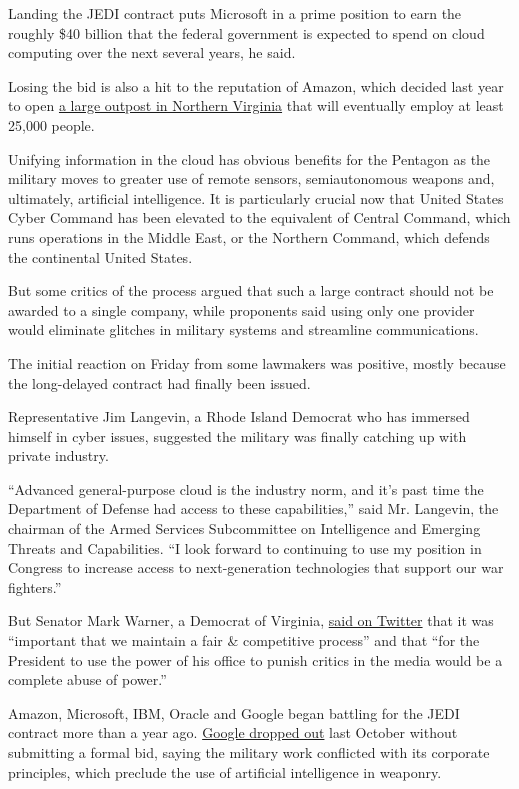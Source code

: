 Landing the JEDI contract puts Microsoft in a prime position to earn the
roughly \$40 billion that the federal government is expected to spend on
cloud computing over the next several years, he said.

Losing the bid is also a hit to the reputation of Amazon, which decided
last year to open
\href{https://www.nytimes3xbfgragh.onion/2018/11/13/business/national-landing-amazon-va.html}{a
large outpost in Northern Virginia} that will eventually employ at least
25,000 people.

Unifying information in the cloud has obvious benefits for the Pentagon
as the military moves to greater use of remote sensors, semiautonomous
weapons and, ultimately, artificial intelligence. It is particularly
crucial now that United States Cyber Command has been elevated to the
equivalent of Central Command, which runs operations in the Middle East,
or the Northern Command, which defends the continental United States.

But some critics of the process argued that such a large contract should
not be awarded to a single company, while proponents said using only one
provider would eliminate glitches in military systems and streamline
communications.

The initial reaction on Friday from some lawmakers was positive, mostly
because the long-delayed contract had finally been issued.

Representative Jim Langevin, a Rhode Island Democrat who has immersed
himself in cyber issues, suggested the military was finally catching up
with private industry.

``Advanced general-purpose cloud is the industry norm, and it's past
time the Department of Defense had access to these capabilities,'' said
Mr. Langevin, the chairman of the Armed Services Subcommittee on
Intelligence and Emerging Threats and Capabilities. ``I look forward to
continuing to use my position in Congress to increase access to
next-generation technologies that support our war fighters.''

But Senator Mark Warner, a Democrat of Virginia,
\href{https://twitter.com/MarkWarner/status/1157341554346008576}{said on
Twitter} that it was ``important that we maintain a fair \& competitive
process'' and that ``for the President to use the power of his office to
punish critics in the media would be a complete abuse of power.''

Amazon, Microsoft, IBM, Oracle and Google began battling for the JEDI
contract more than a year ago.
\href{https://www.bloomberg.com/news/articles/2018-10-08/google-drops-out-of-pentagon-s-10-billion-cloud-competition}{Google
dropped out} last October without submitting a formal bid, saying the
military work conflicted with its corporate principles, which preclude
the use of artificial intelligence in weaponry.


